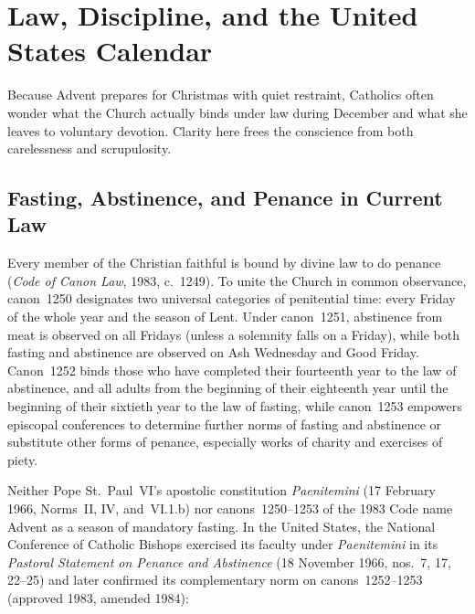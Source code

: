 \section{Law, Discipline, and the United States Calendar}\label{sec:law-calendar}

Because Advent prepares for Christmas with quiet restraint, Catholics often wonder what the Church actually binds under law during December and what she leaves to voluntary devotion. Clarity here frees the conscience from both carelessness and scrupulosity.

\subsection{Fasting, Abstinence, and Penance in Current Law}

Every member of the Christian faithful is bound by divine law to do penance (\textit{Code of Canon Law}, 1983, c.~1249). To unite the Church in common observance, canon~1250 designates two universal categories of penitential time: every Friday of the whole year and the season of Lent. Under canon~1251, abstinence from meat is observed on all Fridays (unless a solemnity falls on a Friday), while both fasting and abstinence are observed on Ash Wednesday and Good Friday. Canon~1252 binds those who have completed their fourteenth year to the law of abstinence, and all adults from the beginning of their eighteenth year until the beginning of their sixtieth year to the law of fasting, while canon~1253 empowers episcopal conferences to determine further norms of fasting and abstinence or substitute other forms of penance, especially works of charity and exercises of piety.

Neither Pope St.~Paul~VI's apostolic constitution \textit{Paenitemini} (17 February 1966, Norms~II, IV, and~VI.1.b) nor canons~1250--1253 of the 1983 Code name Advent as a season of mandatory fasting. In the United States, the National Conference of Catholic Bishops exercised its faculty under \textit{Paenitemini} in its \textit{Pastoral Statement on Penance and Abstinence} (18 November 1966, nos.~7, 17, 22--25) and later confirmed its complementary norm on canons~1252--1253 (approved 1983, amended 1984):

